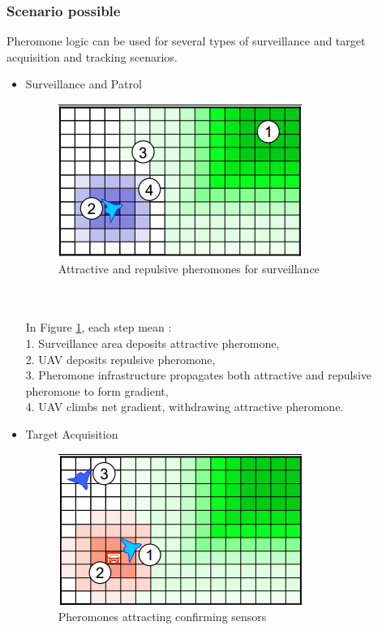 \subsubsection{Scenario possible}
Pheromone logic  can  be  used  for  several  types  of  surveillance  and target  acquisition  and  tracking scenarios.\\
\begin{itemize}
\item Surveillance and Patrol
\begin{figure}[h]
\center
\includegraphics[scale=0.7]{../images/pheromone_surveillance.png}
\caption{\label{surveillance}Attractive and repulsive pheromones for surveillance}
\end{figure}\\\\
In Figure \ref{surveillance}, each step mean :\\
 1. Surveillance area deposits attractive pheromone,\\
 2. UAV deposits repulsive pheromone,\\ 
 3. Pheromone infrastructure propagates both attractive and repulsive pheromone to form gradient,\\
 4. UAV climbs net gradient, withdrawing attractive pheromone.
\item Target Acquisition
\begin{figure}[h]
\center
\includegraphics[scale=0.7]{../images/pheromone_target_acquisition.png}
\caption{\label{targetacquisition}Pheromones attracting confirming sensors}
\end{figure}\\\\

\end{itemize}
